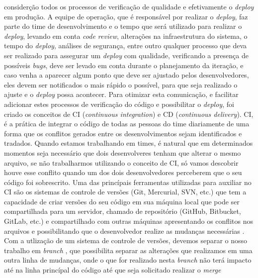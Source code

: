     considerção todos os processos de verificação de qualidade e efetivamente
    o \textit{deploy} em produção. A equipe de operação, que é responsável por
    realizar o \textit{deploy}, faz parte do time de desenvolvimento e o tempo
    que será utilizado para realizar o \textit{deploy}, levando em conta
    \textit{code review}, alterações na infraestrutura do sistema, o tempo do
    \textit{deploy}, análises de segurança, entre outro qualquer processo que
    deva ser realizado para assegurar um \textit{deploy} com qualidade, verificando
    a presença de possíveis \textit{bugs}, deve ser levado em conta durante o
    planejamento da iteração, e caso venha a aparecer algum ponto que deve ser
    ajustado pelos desenvolvedores, eles devem ser notificados o mais rápido o
    possível, para que seja realizado o ajuste e o \textit{deploy} possa acontecer. \newline
    Para otimizar esta comunicação, e facilitar adicionar estes processos de
    verificação do código e possibilitar o \textit{deploy}, foi criado os
    conceitos de CI (\textit{continuous integration}) e CD
    (\textit{continuous delivery}). \newline
    CI, é a prática de integrar o código de todas as pessoas do time diariamente
    de uma forma que os conflitos gerados entre os desenvolvimentos sejam
    identificados e tradados. Quando estamos trabalhando em times, é natural
    que em determinados momentos seja necessário que dois desenvolveres tenham
    que alterar o mesmo arquivo, se não trabalharmos utilizando o conceito de
    CI, só vamos descobrir houve esse conflito quando um dos dois desenvolvedores
    perceberem que o seu código foi sobrescrito. Uma das princípais ferramentas
    utilizadas para auxiliar no CI são os sistemas de controle de versões
    (Git, Mercurial, SVN, etc.) que tem a capacidade de criar versões do seu
    código em sua máquina local que pode ser compartilhada para um servidor,
    chamado de repositório (GitHub, Bitbucket, GitLab, etc.) e compartilhado
    com outras máquinas apresentando os conflitos nos arquivos e possibilitando
    que o desenvolvedor realize as mudanças necessárias \cite{ProGit}. \newline
    Com a utlização de um sistema de controle de versões, devemos separar o
    nosso trabalho em \textit{branch} \cite{TheDevOpsHandbook}, que possibilita
    separar as alterações que realizamos em uma outra linha de mudanças, onde
    o que for realizado nesta \textit{branch} não terá impacto até na linha
    princípal do código até que seja solicitado realizar o \textit{merge}
